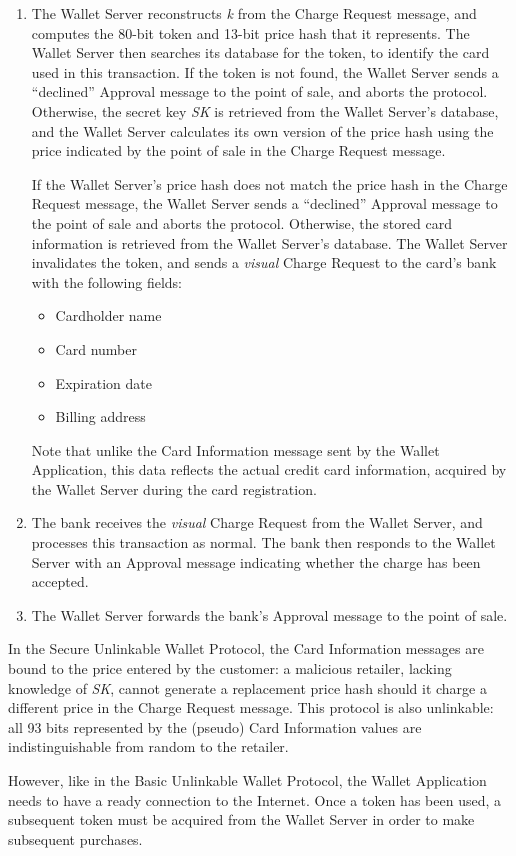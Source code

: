 \begin{enumerate}
\item The Wallet Server reconstructs \emph{k} from the Charge Request message, and computes the 80-bit token and 13-bit price hash that it represents.
    The Wallet Server then searches its database for the token, to identify the card used in this transaction.
    If the token is not found, the Wallet Server sends a ``declined'' Approval message to the point of sale, and aborts the protocol.
    Otherwise, the secret key \emph{SK} is retrieved from the Wallet Server's database, and the Wallet Server calculates its own version of the price hash
        using the price indicated by the point of sale in the Charge Request message.

    If the Wallet Server's price hash does not match the price hash in the Charge Request message,
        the Wallet Server sends a ``declined'' Approval message to the point of sale and aborts the protocol.
    Otherwise, the stored card information is retrieved from the Wallet Server's database.
    The Wallet Server invalidates the token, and sends a \emph{visual} Charge Request to the card's bank with the following fields:
    \begin{itemize}
    \item Cardholder name
    \item Card number
    \item Expiration date
    \item Billing address
    \end{itemize}
    Note that unlike the Card Information message sent by the Wallet Application, this data reflects the actual credit card information,
        acquired by the Wallet Server during the card registration.

\item The bank receives the \emph{visual} Charge Request from the Wallet Server, and processes this transaction as normal.
    The bank then responds to the Wallet Server with an Approval message indicating whether the charge has been accepted.

\item The Wallet Server forwards the bank's Approval message to the point of sale.
\end{enumerate}

In the Secure Unlinkable Wallet Protocol, the Card Information messages are bound to the price entered by the customer:
    a malicious retailer, lacking knowledge of \emph{SK}, cannot generate a replacement price hash should it charge a different price in the Charge Request message.
This protocol is also unlinkable: all 93 bits represented by the (pseudo) Card Information values are indistinguishable from random to the retailer.

However, like in the Basic Unlinkable Wallet Protocol, the Wallet Application needs to have a ready connection to the Internet.
Once a token has been used, a subsequent token must be acquired from the Wallet Server in order to make subsequent purchases.